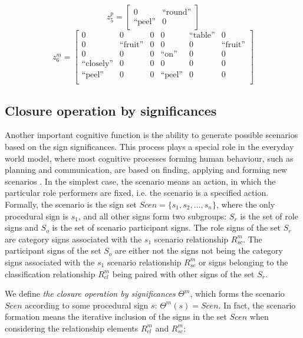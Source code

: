 \documentclass[review]{elsarticle}
\begin{document}
\[
z_5^p = \begin{bmatrix}
0& \text{``round''} \\
\text{``peel''} &0
\end{bmatrix}
\]
\[
z_6^m= \left[\begin{array}{ccc|cccc}
0&0&0&0&\text{``table''}&0\\
0&\text{``fruit''}&0& 0&0&\text{``fruit''}\\
0& 0& 0 &\text{``on''} &0&0\\
\text{``closely''}& 0& 0 &0 &0&0\\
\text{``peel''} &0 &0 &\text{``peel''}  &0&0\\
\end{array}
\right]
\] 

\subsection{Closure operation by significances}
Another important cognitive function is the ability to generate possible scenarios based on the sign significances. This process plays a special role in the everyday world model, where most cognitive processes forming human behaviour, such as planning and communication, are based on finding, applying and forming new scenarios \cite{Osipov2015d}. In the simplest case, the scenario means an action, in which the particular role performers are fixed, i.e. the scenario is a specified action. Formally, the scenario is the sign set $Scen=\{s_1,s_2,\dots, s_n\}$, where the only procedural sign is $s_1$, and all other signs form two subgroups: $S_r$ is the set of role signs and $S_o$ is the set of scenario participant signs. The role signs of the set $S_r$ are category signs associated with the $s_1$ scenario relationship $R_{sc}^m$. The participant signs of the set $S_o$ are either not the signs not being the category signs associated with the $s_1$ scenario relationship $R_{sc}^m$ or signs belonging to the classification relationship $R_{cl}^m$ being paired with other signs of the set $S_r$.

We define \textit{the closure operation by significances} $\Theta^m$, which forms the scenario $Scen$ according to some procedural sign $s$: $\Theta^m(s)=Scen$. In fact, the scenario formation means the iterative inclusion of the signs in the set $Scen$ when considering the relationship elements $R_{cl}^m$ and $R_{sc}^m$:
\end{document}

